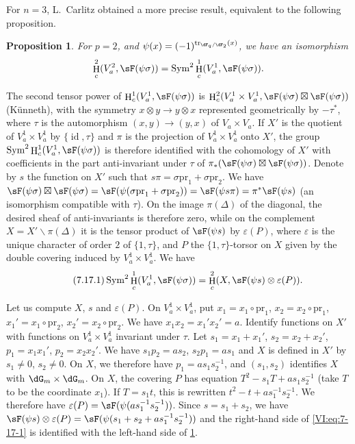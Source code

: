 \documentclass[oneside]{book}
\DeclareMathOperator{\h}{H}
\DeclareMathOperator{\tr}{tr}
\newcounter{char}
\renewcommand{\setminus}{\smallsetminus}
\newcommand{\pr}{\mathrm{pr}} %
\theoremstyle{sga-source}
\theoremstyle{sga-source-dash}
\theoremstyle{sga-source-dotdash}
\theoremstyle{sga-source-number-note-dash}
\theoremstyle{sga-source-note-number-dotdash}
\theoremstyle{sga-source-example-dotdash}
\theoremstyle{sga-source-inline-number}
\theoremstyle{sga-source-bare-number}
\theoremstyle{sga-source}
\newtheorem{proposition_}[subsection]{Proposition}
\newcommand{\PrintPage}[1]{}\newcommand{\MathPage}[1]{}\newcommand{\PrintCite}[2]{#1}\newcommand{\var}[3]{#2}
\begin{document}
For $n=3$, L.\ Carlitz \cite{ca69-2} obtained a more precise result, 
equivalent to the following proposition. 





\begin{proposition_}\label{VI:7-17}
For $p=2$, and $\psi(x)=(-1)^{\tr_{\dF_q/\dF_2}(x)}$, we have an isomorphism 
\[
  \h_c^2(V_a^2,\sF(\psi\sigma)) = \operatorname{Sym}^2 \h_c^1(V_a^1,\sF(\psi\sigma)) \text{.} 
\]
\end{proposition_}

\PrintPage{227}
The second tensor power of $\h_c^1(V_a^1,\sF(\psi\sigma))$ is 
$\h_c^2(V_a^1\times V_a^1,\sF(\psi\sigma)\boxtimes \sF(\psi\sigma))$ 
(K\"unneth), with the symmetry $x\otimes y\to y\otimes x$ represented 
geometrically by $-\tau^\ast$, where $\tau$ is the automorphism 
$(x,y)\to (y,x)$ of $V_a\times V_a$. If $X'$ is the quotient of 
$V_a^1\times V_a^1$ by $\{\operatorname{id}{},\tau\}$ and $\pi$ is the 
projection of $V_a^1\times V_a^1$ onto $X'$, the group 
$\operatorname{Sym}^2 \h_c^1(V_a^1,\sF(\psi\sigma))$ is therefore identified with the 
cohomology of $X'$ with coefficients in the part anti-invariant under $\tau$ of 
$\pi_\ast(\sF(\psi\sigma)\boxtimes \sF(\psi\sigma))$. Denote by $s$ the function 
on $X'$ such that $s\pi =\sigma\pr_1+\sigma\pr_2$. We have 
$\sF(\psi\sigma)\boxtimes \sF(\psi\sigma) = \sF(\psi(\sigma\pr_1+\sigma\pr_2)) = \sF(\psi s \pi) = \pi^\ast \sF(\psi s)$ 
(an isomorphism compatible with $\tau$). On the image $\pi(\Delta)$ of the 
diagonal, the desired sheaf of anti-invariants is therefore zero, while on 
the complement $X=X'\setminus \pi(\Delta)$ it is the tensor product of 
$\sF(\psi s)$ by $\varepsilon(P)$, where $\varepsilon$ is the unique character 
of order $2$ of $\{1,\tau\}$, and $P$ the $\{1,\tau\}$-torsor on $X$ given by the 
double covering induced by $V_a^1\times V_a^1$. We have 
\begin{equation*}\tag{7.17.1}\label{VI:eq:7-17-1}
  \operatorname{Sym}^2 \h_c^1(V_a^1,\sF(\psi\sigma)) = \h_c^2(X,\sF(\psi s)\otimes \varepsilon(P)) \text{.}
\end{equation*}

Let us compute $X$, $s$ and $\varepsilon(P)$. On $V_a^1\times V_a^1$, put 
$x_1=x_1\circ\pr_1$, $x_2=x_2\circ\pr_1$, $x_1'=x_1\circ \pr_2$, 
$x_2'=x_2\circ \pr_2$. We have $x_1 x_2=x_1'x_2'=a$. Identify functions on 
$X'$ with \var{functions on $X$ invariant under $\tau$}{functions on $V_a^1\times V_a^1$ invariant under $\tau$}{S45-SOL-0959}. Let $s_1=x_1+x_1'$, 
$s_2=x_2+x_2'$, $p_1=x_1 x_1'$, $p_2=x_2 x_2'$. We have $s_1 p_2 = a s_2$, 
$s_2 p_1 = a s_1$ and $X$ is defined in $X'$ by $s_1\ne 0$, $s_2\ne 0$. On 
$X$, we therefore have $p_1 = a s_1 s_2^{-1}$, and $(s_1,s_2)$ identifies $X$ with 
$\dG_m\times \dG_m$. On $X$, the covering $P$ has equation 
$T^2-s_1 T+a s_1 s_2^{-1}$ (take $T$ to be the coordinate $x_1$). If 
$T=s_1 t$, this is rewritten $t^2-t+a s_1^{-1} s_2^{-1}$. We therefore have 
$\varepsilon(P) = \sF(\psi(a s_1^{-1} s_2^{-1}))$. Since $s=s_1+s_2$, we have 
$\sF(\psi s)\otimes \varepsilon(P) = \sF(\psi(s_1+s_2+ a s_1^{-1} s_2^{-1}))$ 
and the right-hand side of \eqref{VI:eq:7-17-1} is identified with the left-hand side of 
\ref{VI:7-17}. 
\end{document}
